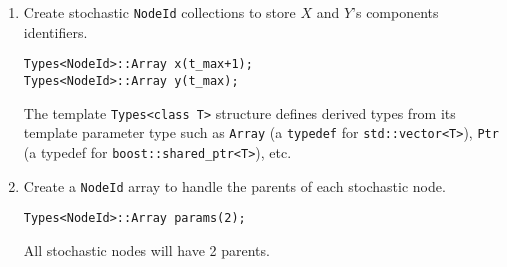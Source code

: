 \begin{enumerate}
\item Create stochastic \texttt{NodeId} collections to store $X$ and $Y$'s components identifiers.
\begin{lstlisting}
Types<NodeId>::Array x(t_max+1);
Types<NodeId>::Array y(t_max);
\end{lstlisting}
The template \verb=Types<class T>= structure defines derived types from its template parameter type such as \texttt{Array} (a \verb=typedef= for \verb=std::vector<T>=), \texttt{Ptr} (a typedef for \verb=boost::shared_ptr<T>=), etc.

\item Create a \texttt{NodeId} array to handle the parents of each stochastic node.
\begin{lstlisting}
Types<NodeId>::Array params(2);
\end{lstlisting}
All stochastic nodes will have 2 parents.



\end{enumerate}
